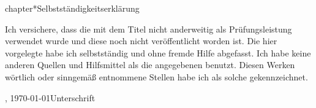 chapter*{Selbstständigkeitserklärung}
\label{sec:eidesstatlicheErklaerung}

Ich versichere, dass die \thesis{} mit dem Titel \glqq{}\thesistitle \grqq{} nicht anderweitig als Prüfungsleistung verwendet wurde und diese \thesis{} noch nicht veröffentlicht worden ist. Die hier vorgelegte \thesis{} habe ich selbstständig und ohne fremde Hilfe abgefasst. Ich habe keine anderen Quellen und Hilfsmittel als die angegebenen benutzt. Diesen Werken wörtlich oder sinngemäß entnommene Stellen habe ich als solche gekennzeichnet.
\vfill

\begin{center}
\begin{minipage}{0.9\textwidth}
\place, \today \hfill  Unterschrift
\end{minipage}
\end{center}